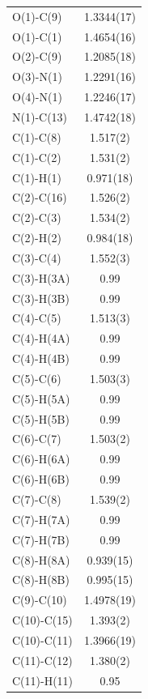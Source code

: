 \begin{center}
\tablefirsthead{%
\toprule}
\tablelasttail{\bottomrule}
{\footnotesize \singlespacing
\begin{supertabular}{p{1.5in}c}
O(1)-C(9)&1.3344(17)\\
O(1)-C(1)&1.4654(16)\\
O(2)-C(9)&1.2085(18)\\
O(3)-N(1)&1.2291(16)\\
O(4)-N(1)&1.2246(17)\\
N(1)-C(13)&1.4742(18)\\
C(1)-C(8)&1.517(2)\\
C(1)-C(2)&1.531(2)\\
C(1)-H(1)&0.971(18)\\
C(2)-C(16)&1.526(2)\\
C(2)-C(3)&1.534(2)\\
C(2)-H(2)&0.984(18)\\
C(3)-C(4)&1.552(3)\\
C(3)-H(3A)&0.99\\
C(3)-H(3B)&0.99\\
C(4)-C(5)&1.513(3)\\
C(4)-H(4A)&0.99\\
C(4)-H(4B)&0.99\\
C(5)-C(6)&1.503(3)\\
C(5)-H(5A)&0.99\\
C(5)-H(5B)&0.99\\
C(6)-C(7)&1.503(2)\\
C(6)-H(6A)&0.99\\
C(6)-H(6B)&0.99\\
C(7)-C(8)&1.539(2)\\
C(7)-H(7A)&0.99\\
C(7)-H(7B)&0.99\\
C(8)-H(8A)&0.939(15)\\
C(8)-H(8B)&0.995(15)\\
C(9)-C(10)&1.4978(19)\\
C(10)-C(15)&1.393(2)\\
C(10)-C(11)&1.3966(19)\\
C(11)-C(12)&1.380(2)\\
C(11)-H(11)&0.95\\

\end{supertabular}}
\end{center}
